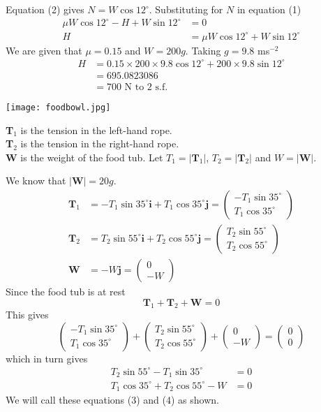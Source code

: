 \documentclass[a4paper,12pt]{article}
\numberwithin{equation}{section}
\begin{document}
\begin{question}
Equation (2) gives $N=W\cos{12^\circ}$. Substituting for $N$ in equation (1)
\begin{align*}
\mu{W}\cos{12^\circ}-H+W\sin{12^\circ}&=0\\
H&=\mu{W}\cos{12^\circ}+W\sin{12^\circ}
\end{align*}
We are given that $\mu=0.15$ and $W=200g$. Taking $g=9.8$ ms$^{-2}$
\begin{align*}
H&=0.15\times200\times9.8\cos{12^\circ}+200\times9.8\sin{12^\circ}\\
&=695.0823086\\
&=700\text{ N to 2 s.f.}
\end{align*}
\qpart
\qsubpart
\begin{center}
\texttt{[image: foodbowl.jpg]}
\end{center}
\textbf{T$_1$} is the tension in the left-hand rope.\\
\textbf{T$_2$} is the tension in the right-hand rope.\\
\textbf{W} is the weight of the food tub.
\qsubpart
Let $T_1 = |\textbf{T$_1$}|$, $T_2 =|\textbf{T$_2$}|$ and $W =|\textbf{W}|$.

We know that $|\textbf{W}|=20g$.
\begin{align*}
\textbf{T$_1$}&=-T_1\sin{35^\circ}\textbf{i}+T_1\cos{35^\circ}\textbf{j}=
\begin{pmatrix}
-T_1\sin{35^\circ}\\
T_1\cos{35^\circ}
\end{pmatrix}\\
\textbf{T$_2$}&=T_2\sin{55^\circ}\textbf{i}+T_2\cos{55^\circ}\textbf{j}=
\begin{pmatrix}
T_2\sin{55^\circ}\\
T_2\cos{55^\circ}
\end{pmatrix}\\
\textbf{W}&=-W\textbf{j}=
\begin{pmatrix}
0\\
-W
\end{pmatrix}
\end{align*}
Since the food tub is at rest
\[\textbf{T$_1$}+\textbf{T$_2$}+\textbf{W}=0\]
This gives
\[
\begin{pmatrix}
-T_1\sin{35^\circ}\\
T_1\cos{35^\circ}
\end{pmatrix}
+
\begin{pmatrix}
T_2\sin{55^\circ}\\
T_2\cos{55^\circ}
\end{pmatrix}
+
\begin{pmatrix}
0\\
-W
\end{pmatrix}
=
\begin{pmatrix}
0\\
0
\end{pmatrix}
\]
which in turn gives
\begin{align}
T_2\sin{55^\circ}-T_1\sin{35^\circ}&=0\\
T_1\cos{35^\circ}+T_2\cos{55^\circ}-W&=0
\end{align}
We will call these equations (3) and (4) as shown.


\end{question}
\end{document}
